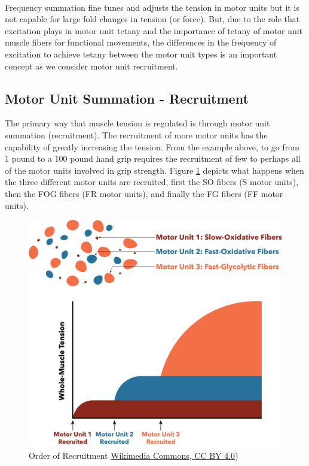 \paragraph{}

Frequency summation fine tunes and adjusts the tension in motor units but it is not capable for large fold changes in tension (or force). But, due to the role that excitation plays in motor unit tetany and the importance of tetany of motor unit muscle fibers for functional movements, the differences in the frequency of excitation to achieve tetany between the motor unit types is an important concept as we consider motor unit recruitment.

\subsection{Motor Unit Summation - Recruitment}

The primary way that muscle tension is regulated is through motor unit summation (recruitment). The recruitment of more motor units has the capability of greatly increasing the tension. From the example above, to go from 1 pound to a 100 pound hand grip requires the recruitment of few to perhaps all of the motor units involved in grip strength. Figure \ref{fig:Motor_unit_recruitment} depicts what happens when the three different motor units are recruited, first the SO fibers (S motor units), then the FOG fibers (FR motor units), and finally the FG fibers (FF motor units).\footnotemark{}


\begin{figure}[!ht]
    \centering
    \includegraphics[width=1\linewidth]{./figure/Motor_unit_recruitment.png}
    \caption{Order of Recruitment \footnotesize{\href{https://commons.wikimedia.org/wiki/File:Motor_unit_recruitment.png}{Wikimedia Commons, CC BY 4.0})}}
    \label{fig:Motor_unit_recruitment}
\end{figure}

